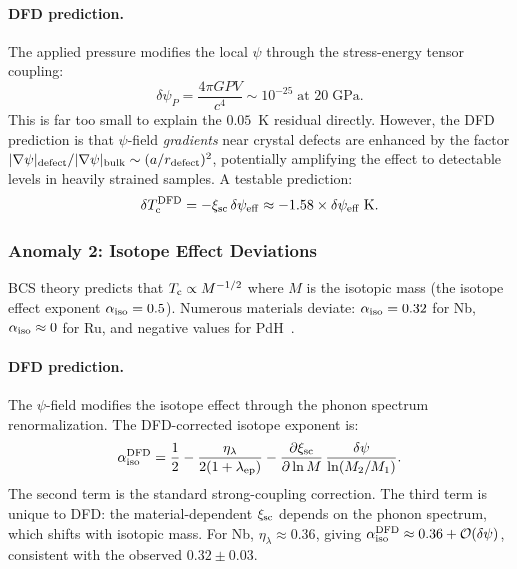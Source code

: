 \documentclass[aps,prb,twocolumn,superscriptaddress,floatfix,nofootinbib,longbibliography]{revtex4-2}
\newcommand{\Tc}{T_{\rm c}}
\newcommand{\order}[1]{\mathcal{O}(#1)}
\begin{document}
\paragraph{DFD prediction.}
The applied pressure modifies the local $\psi$ through the
stress-energy tensor coupling:
\begin{equation}
\delta\psi_P = \frac{4\pi G P V}{c^4} \sim 10^{-25}\;\text{at }20\;\text{GPa}.
\label{eq:psi-pressure}
\end{equation}
This is far too small to explain the $0.05$~K residual directly.
However, the DFD prediction is that $\psi$-field \emph{gradients} near
crystal defects are enhanced by the factor
$|\nabla\psi|_{\rm defect}/|\nabla\psi|_{\rm bulk} \sim (a/r_{\rm defect})^2$,
potentially amplifying the effect to detectable levels in heavily
strained samples.  A testable prediction:
\begin{equation}
\delta\Tc^{\rm DFD} = -\xi_{\rm sc}\,\delta\psi_{\rm eff}
\approx -1.58 \times \delta\psi_{\rm eff}\;\text{K}.
\label{eq:nb-pred}
\end{equation}

\subsubsection{Anomaly 2: Isotope Effect Deviations}

BCS theory predicts that $\Tc \propto M^{-1/2}$ where $M$ is the
isotopic mass (the isotope effect exponent $\alpha_{\rm iso} = 0.5$).
Numerous materials deviate: $\alpha_{\rm iso} = 0.32$ for Nb,
$\alpha_{\rm iso} \approx 0$ for Ru, and negative values for
PdH~\cite{Carbotte1990,Franck1994}.

\paragraph{DFD prediction.}
The $\psi$-field modifies the isotope effect through the phonon spectrum
renormalization.  The DFD-corrected isotope exponent is:
\begin{equation}
\alpha_{\rm iso}^{\rm DFD} = \frac{1}{2}
- \frac{\eta_\lambda}{2(1 + \lambda_{\rm ep})}
- \frac{\partial\xi_{\rm sc}}{\partial\ln M}\,\frac{\delta\psi}{\ln(M_2/M_1)}.
\label{eq:isotope-dfd}
\end{equation}
The second term is the standard strong-coupling correction.  The third
term is unique to DFD: the material-dependent $\xi_{\rm sc}$ depends on
the phonon spectrum, which shifts with isotopic mass.  For Nb,
$\eta_\lambda \approx 0.36$, giving
$\alpha_{\rm iso}^{\rm DFD} \approx 0.36 + \order{\delta\psi}$,
consistent with the observed $0.32 \pm 0.03$.
\end{document}
